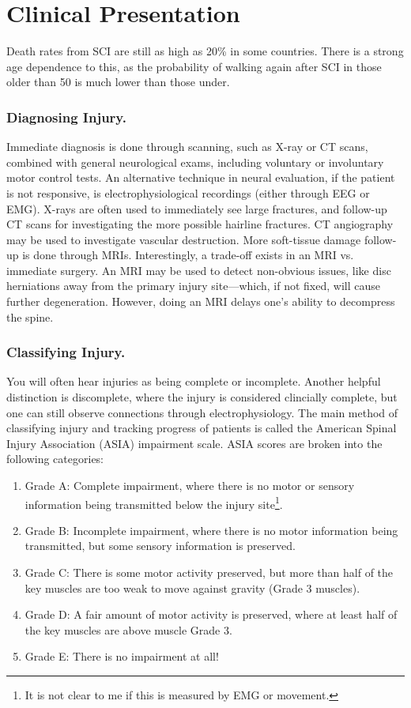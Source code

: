 \section{Clinical Presentation}
Death rates from SCI are still as high as 20\% in some countries. There is a strong age dependence to this, as the probability of walking again after SCI in those older than 50 is much lower than those under.

\subsubsection{Diagnosing Injury.}
Immediate diagnosis is done through scanning, such as X-ray or CT scans, combined with general neurological exams, including voluntary or involuntary motor control tests. An alternative technique in neural evaluation, if the patient is not responsive, is electrophysiological recordings (either through EEG or EMG). X-rays are often used to immediately see large fractures, and follow-up CT scans for investigating the more possible hairline fractures. CT angiography may be used to investigate vascular destruction. More soft-tissue damage follow-up is done through MRIs. Interestingly, a trade-off exists in an MRI vs. immediate surgery. An MRI may be used to detect non-obvious issues, like disc herniations away from the primary injury site---which, if not fixed, will cause further degeneration. However, doing an MRI delays one's ability to decompress the spine.\newline


\subsubsection{Classifying Injury.}
You will often hear injuries as being complete or incomplete. Another helpful distinction is discomplete, where the injury is considered clincially complete, but one can still observe connections through electrophysiology. The main method of classifying injury and tracking progress of patients is called the American Spinal Injury Association (ASIA) impairment scale. ASIA scores are broken into the following categories: 

\begin{enumerate}
    \item Grade A: Complete impairment, where there is no motor or sensory information being transmitted below the injury site\footnote{It is not clear to me if this is measured by EMG or movement.}.
    \item Grade B: Incomplete impairment, where there is no motor information being transmitted, but some sensory information is preserved. 
    \item Grade C: There is some motor activity preserved, but more than half of the key muscles are too weak to move against gravity (Grade 3 muscles). 
    \item Grade D: A fair amount of motor activity is preserved, where at least half of the key muscles are above muscle Grade 3.
    \item Grade E: There is no impairment at all!
\end{enumerate}

